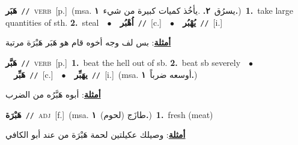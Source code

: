 \documentclass[10pt,a4paper,twoside]{article} %
\begin{document}
\begin{multicols}{2}
{\setlength\topsep{0pt}\textbf{\foreignlanguage{arabic}{هَبَر}}\ {\color{gray}\texttt{//}\color{black}}\ \textsc{verb}\ [p.]\ \color{gray}(msa. \foreignlanguage{arabic}{يسرُق}~\foreignlanguage{arabic}{\textbf{٢.}}  .\foreignlanguage{arabic}{يأخُذ كميات كبيرة من شيء}~\foreignlanguage{arabic}{\textbf{١.}})\color{black}\ \textbf{1.}~take large quantities of sth.  \textbf{2.}~steal\ \ $\bullet$\ \ \setlength\topsep{0pt}\textbf{\foreignlanguage{arabic}{اُهْبُر}}\ {\color{gray}\texttt{//}\color{black}}\ [c.]\ \ $\bullet$\ \ \setlength\topsep{0pt}\textbf{\foreignlanguage{arabic}{يُهْبُر}}\ {\color{gray}\texttt{//}\color{black}}\ [i.]\  \begin{flushright}\color{gray}\foreignlanguage{arabic}{\textbf{\underline{\foreignlanguage{arabic}{أمثلة}}}: بس لف وجه أخوه قام هو هَبَر هَبْرَة مرتبة}\end{flushright}\color{black}} \vspace{2mm}

{\setlength\topsep{0pt}\textbf{\foreignlanguage{arabic}{هَبَّر}}\ {\color{gray}\texttt{//}\color{black}}\ \textsc{verb}\ [p.]\ \textbf{1.}~beat the hell out of sb.  \textbf{2.}~beat sb severely\ \ $\bullet$\ \ \setlength\topsep{0pt}\textbf{\foreignlanguage{arabic}{هَبِّر}}\ {\color{gray}\texttt{//}\color{black}}\ [c.]\ \ $\bullet$\ \ \setlength\topsep{0pt}\textbf{\foreignlanguage{arabic}{يهَبِّر}}\ {\color{gray}\texttt{//}\color{black}}\ [i.]\ \color{gray}(msa. \foreignlanguage{arabic}{أوسعه ضرباً}~\foreignlanguage{arabic}{\textbf{١.}})\color{black}\  \begin{flushright}\color{gray}\foreignlanguage{arabic}{\textbf{\underline{\foreignlanguage{arabic}{أمثلة}}}: أبوه هَبَّرُه من الضرب}\end{flushright}\color{black}} \vspace{2mm}

{\setlength\topsep{0pt}\textbf{\foreignlanguage{arabic}{هَبْرَة}}\ {\color{gray}\texttt{//}\color{black}}\ \textsc{adj}\ [f.]\ \color{gray}(msa. \foreignlanguage{arabic}{طازَج (لحوم)}~\foreignlanguage{arabic}{\textbf{١.}})\color{black}\ \textbf{1.}~fresh (meat)\  \begin{flushright}\color{gray}\foreignlanguage{arabic}{\textbf{\underline{\foreignlanguage{arabic}{أمثلة}}}: وصيلك عكيلتين لحمة هَبْرَة من عند أبو الكافي}\end{flushright}\color{black}} \vspace{2mm}


\end{multicols}
\end{document}
